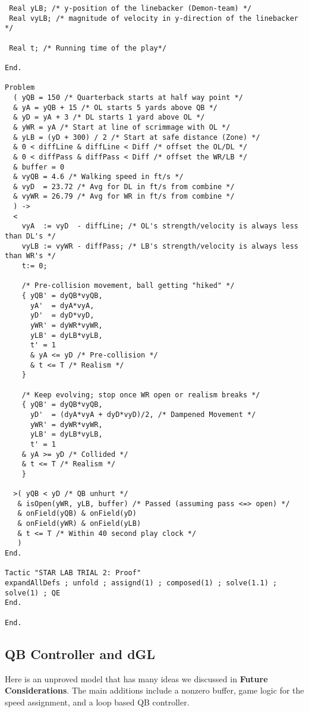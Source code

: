 \begin{lstlisting}
 Real yLB; /* y-position of the linebacker (Demon-team) */
 Real vyLB; /* magnitude of velocity in y-direction of the linebacker */

 Real t; /* Running time of the play*/

End.

Problem
  ( yQB = 150 /* Quarterback starts at half way point */
  & yA = yQB + 15 /* OL starts 5 yards above QB */
  & yD = yA + 3 /* DL starts 1 yard above OL */
  & yWR = yA /* Start at line of scrimmage with OL */
  & yLB = (yD + 300) / 2 /* Start at safe distance (Zone) */
  & 0 < diffLine & diffLine < Diff /* offset the OL/DL */
  & 0 < diffPass & diffPass < Diff /* offset the WR/LB */
  & buffer = 0
  & vyQB = 4.6 /* Walking speed in ft/s */
  & vyD  = 23.72 /* Avg for DL in ft/s from combine */
  & vyWR = 26.79 /* Avg for WR in ft/s from combine */
  ) ->
  <
    vyA  := vyD  - diffLine; /* OL's strength/velocity is always less than DL's */
    vyLB := vyWR - diffPass; /* LB's strength/velocity is always less than WR's */
    t:= 0;

    /* Pre-collision movement, ball getting "hiked" */
    { yQB' = dyQB*vyQB,
      yA'  = dyA*vyA,
      yD'  = dyD*vyD,
      yWR' = dyWR*vyWR,
      yLB' = dyLB*vyLB,
      t' = 1
      & yA <= yD /* Pre-collision */
      & t <= T /* Realism */
    }

    /* Keep evolving; stop once WR open or realism breaks */
    { yQB' = dyQB*vyQB,
      yD'  = (dyA*vyA + dyD*vyD)/2, /* Dampened Movement */
      yWR' = dyWR*vyWR,
      yLB' = dyLB*vyLB,
      t' = 1
    & yA >= yD /* Collided */
    & t <= T /* Realism */
    }

  >( yQB < yD /* QB unhurt */
   & isOpen(yWR, yLB, buffer) /* Passed (assuming pass <=> open) */
   & onField(yQB) & onField(yD)
   & onField(yWR) & onField(yLB)
   & t <= T /* Within 40 second play clock */
   )
End.

Tactic "STAR LAB TRIAL 2: Proof"
expandAllDefs ; unfold ; assignd(1) ; composed(1) ; solve(1.1) ; solve(1) ; QE
End.

End.
\end{lstlisting}

\newpage

\subsection{QB Controller and dGL}

Here is an unproved model that has many ideas we discussed in \textbf{Future Considerations}. The main additions include a nonzero buffer, game logic for the speed assignment, and a loop based QB controller.

